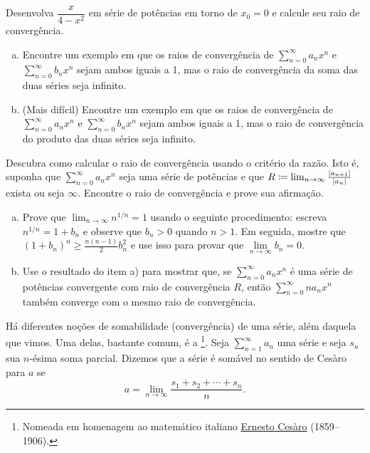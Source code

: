 \begin{exercise}
Desenvolva
$\dfrac{x}{4-x^2}$ em série de potências em torno de $x_0 = 0$
e calcule seu raio de convergência.
\end{exercise}

\begin{exercise}
\leavevmode
\begin{enumerate}[a)]
\item
Encontre um exemplo em que os raios de convergência de $\sum_{n=0}^\infty a_n x^n$ e
$\sum_{n=0}^\infty b_n x^n$ sejam ambos iguais a 1, mas o raio de convergência
da soma das duas séries seja infinito.
\item
(Mais difícil)
Encontre um exemplo em que os raios de convergência de $\sum_{n=0}^\infty a_n x^n$ e
$\sum_{n=0}^\infty b_n x^n$ sejam ambos iguais a 1, mas o raio de convergência
do produto das duas séries seja infinito.
\end{enumerate}
\end{exercise}

\begin{exercise}
Descubra como calcular o raio de convergência usando o critério da razão.
Isto é, suponha que $\sum_{n=0}^\infty a_n x^n$ seja uma série de potências e que
$R \coloneqq \lim_{n\to\infty} \frac{\lvert {a_{n+1}} \rvert}{\lvert {a_n} \rvert}$ exista ou seja $\infty$.
Encontre o raio de convergência e prove sua afirmação.
\end{exercise}

\begin{samepage}
\begin{exercise}
\leavevmode
\begin{enumerate}[a)]
\item
Prove que $\lim_{n\to\infty} n^{1/n} = 1$ usando o seguinte procedimento: escreva $n^{1/n} = 1+b_n$ e
observe que $b_n > 0$ quando $n > 1$. Em seguida, mostre que ${(1+b_n)}^n \geq
\frac{n(n-1)}{2}b_n^2$ e use isso para provar que $\lim\limits_{n\to\infty} b_n = 0$.
\item
Use o resultado do item a) para mostrar que,
se $\sum_{n=0}^\infty a_n x^n$ é uma série de potências convergente com raio de convergência $R$,
então $\sum_{n=0}^\infty n a_n x^n$ também converge com o mesmo raio de convergência.
\end{enumerate}
\end{exercise}
\end{samepage}

\begin{exnote}
Há diferentes noções de somabilidade (convergência)
de uma série,
além daquela que vimos.
Uma delas, bastante comum, é a \emph{}%
\footnote{Nomeada em homenagem ao matemático italiano
\href{https://en.wikipedia.org/wiki/Ernesto_Ces\%C3\%A0ro}{Ernesto Ces\`aro}
(1859--1906).}. Seja $\sum_{n=1}^\infty a_n$ uma série
e seja $s_n$ sua $n$-ésima soma parcial. Dizemos que a série é
somável no sentido de Ces\`aro para $a$ se
\begin{equation*}
a = \lim_{n\to \infty} \frac{s_1 + s_2 + \cdots + s_n}{n} .
\end{equation*}
\end{exnote}


